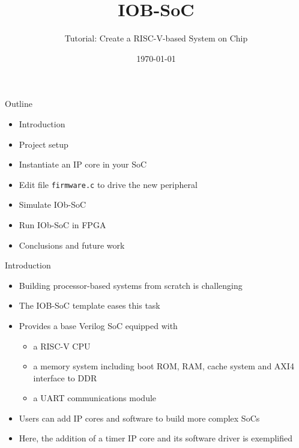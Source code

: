 \documentclass [xcolor=svgnames, t] {beamer}
\title[IOB-SoC Presentation]{IOB-SoC}
\subtitle{Tutorial: Create a RISC-V-based System on Chip}
\institute[IObundle Lda]{IObundle Lda.}
\date{\today}
\begin{document}
\begin{frame}
 \titlepage   
\end{frame}


\begin{frame}{Outline}
\begin{center}
   \begin{itemize}
     \item Introduction
     \item Project setup
     \item Instantiate an IP core in your SoC
     \item Edit file {\tt firmware.c} to drive the new peripheral
     \item Simulate IOb-SoC
     \item Run IOb-SoC in FPGA
     \item Conclusions and future work
 \end{itemize}
\end{center}
\end{frame}


\begin{frame}{Introduction}
\begin{center}
    \begin{itemize}
      \item Building processor-based systems from scratch is challenging
      \item The IOB-SoC template eases this task
      \item Provides a base Verilog SoC equipped with
        \begin{itemize}
        \item a RISC-V CPU
        \item a memory system including boot ROM, RAM, cache system and AXI4 interface to DDR
        \item a UART communications module
        \end{itemize}
      \item Users can add IP cores and software to build more complex SoCs
      \item Here, the addition of a timer IP core and its software driver is exemplified
    \end{itemize}
\end{center}
\end{frame}
\end{document}
